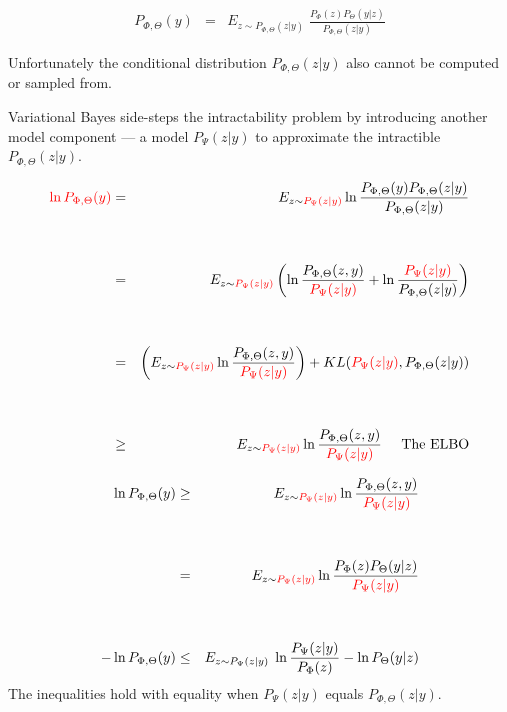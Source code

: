 {

\begin{eqnarray*}
P_{\Phi,\Theta}(y) & = & E_{z\sim P_{\Phi,\Theta}(z|y)}\;\frac{P_\Phi(z)P_\Theta(y|z)}{P_{\Phi,\Theta}(z|y)}
\end{eqnarray*}

Unfortunately the conditional distribution $P_{\Phi,\Theta}(z|y)$ also cannot be computed or sampled from.

\vfill
Variational Bayes side-steps the intractability problem by introducing another model component --- a model $P_\Psi(z|y)$ to approximate the intractible $P_{\Phi,\Theta}(z|y)$.


{\huge
\begin{eqnarray*}
 {\color{red} \ln P_{\Phi,\Theta}(y)} & = & E_{z \sim {\color{red} P_\Psi(z|y)}} \ln \frac{P_{\Phi,\Theta}(y)P_{\Phi,\Theta}(z|y)}{P_{\Phi,\Theta}(z|y)} \\
        \\
        \\
 & = & E_{z \sim {\color{red} P_\Psi(z|y)}} \left(\ln \frac{P_{\Phi,\Theta}(z,y)}{{\color{red} P_\Psi(z|y)}} + \ln \frac{{\color{red} P_\Psi(z|y)}}{P_{\Phi,\Theta}(z|y)}\right) \\
 \\
 \\
  & = & \left(E_{z \sim {\color{red} P_\Psi(z|y)}} \ln \frac{P_{\Phi,\Theta}(z,y)}{{\color{red} P_\Psi(z|y)}}\right) + KL({\color{red} P_\Psi(z|y)},P_{\Phi,\Theta}(z|y)) \\
  \\
  \\
  &  \geq & E_{z \sim {\color{red} P_\Psi(z|y)}} \ln \frac{P_{\Phi,\Theta}(z,y)}{{\color{red} P_\Psi(z|y)}} \;\;\;\;\;\mbox{The ELBO}
\end{eqnarray*}
}


{\huge
\begin{eqnarray*}
\ln P_{\Phi,\Theta}(y)   &  \geq & E_{z \sim {\color{red} P_\Psi(z|y)}} \ln \frac{P_{\Phi,\Theta}(z,y)}{{\color{red} P_\Psi(z|y)}} \\
  \\
  \\
  & = & E_{z \sim {\color{red} P_\Psi(z|y)}} \ln \frac{P_\Phi(z)P_\Theta(y|z)}{{\color{red} P_\Psi(z|y)}} \nonumber \\
   \\
   \\
- \ln P_{\Phi,\Theta}(y) & \leq & E_{z \sim P_\Psi(z|y)}\;\ln\frac{P_\Psi(z|y)}{P_\Phi(z)} - \ln P_\Theta(y|z)
\end{eqnarray*}
}
\vfill
The inequalities hold with equality when $P_\Psi(z|y)$ equals $P_{\Phi,\Theta}(z|y)$.


}
